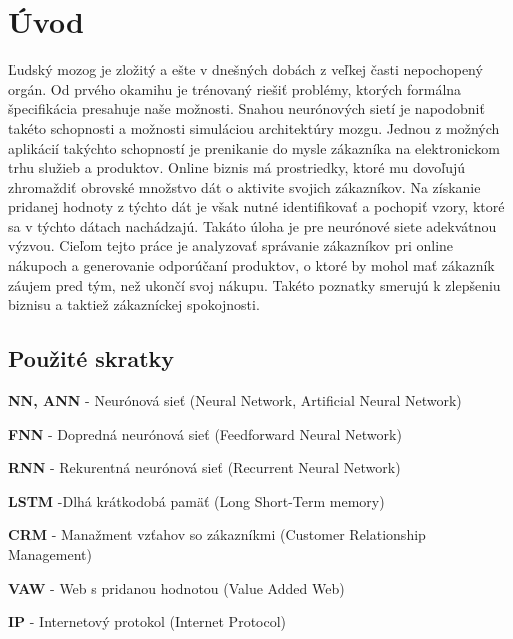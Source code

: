 \newpage
\chapter{Úvod}

Ľudský mozog je zložitý a ešte v dnešných dobách z veľkej časti nepochopený orgán. Od prvého okamihu je trénovaný riešiť problémy, ktorých formálna špecifikácia presahuje naše možnosti. Snahou neurónových sietí je napodobniť takéto schopnosti a možnosti simuláciou architektúry mozgu. \newline
Jednou z možných aplikácií takýchto schopností je prenikanie do mysle zákazníka na elektronickom trhu služieb a produktov. Online biznis má prostriedky, ktoré mu dovoľujú zhromaždiť obrovské množstvo dát o aktivite svojich zákazníkov. Na získanie pridanej hodnoty z týchto dát je však nutné identifikovať a pochopiť vzory, ktoré sa v týchto dátach nachádzajú. Takáto úloha je pre neurónové siete adekvátnou výzvou. Cieľom tejto práce je analyzovať správanie zákazníkov pri online nákupoch a generovanie odporúčaní produktov, o ktoré by mohol mať zákazník záujem pred tým, než ukončí svoj nákupu. Takéto poznatky smerujú k zlepšeniu biznisu a taktiež zákazníckej spokojnosti.
\newpage

\section{Použité skratky}
\label{uvod_pouzite_skratky}

\begin{my_itemize}
\item \textbf{NN, ANN} - Neurónová sieť (Neural Network, Artificial Neural Network)
\item \textbf{FNN} - Dopredná neurónová sieť (Feedforward Neural Network)
\item \textbf{RNN} - Rekurentná neurónová sieť (Recurrent Neural Network)
\item \textbf{LSTM} -Dlhá krátkodobá pamäť (Long Short-Term memory)
\item \textbf{CRM} - Manažment vzťahov so zákazníkmi (Customer Relationship Management)
\item \textbf{VAW} - Web s pridanou hodnotou (Value Added Web)
\item \textbf{IP} - Internetový protokol (Internet Protocol)
\end{my_itemize}
